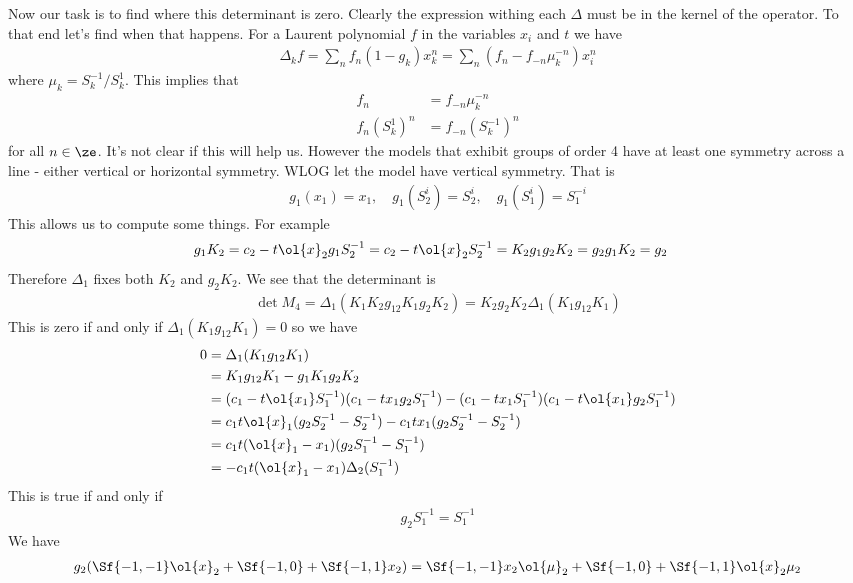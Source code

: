  Now our task is to find where this determinant is zero. Clearly the expression withing each $\Delta$ must be in the kernel of the operator. To that end let's find when that happens. For a Laurent polynomial $f$ in the variables $x_i$ and $t$ we have
\begin{align}
	\Delta_k f = \sum_n f_n (1-g_k)x_k^n = \sum_n (f_n - f_{-n}\mu_k^{-n})x_i^n
\end{align}
where $\mu_k = S_k^{-1}/S_k^1$. This implies that
\begin{align}
	f_{n} &= f_{-n} \mu_k^{-n}\\
	f_{n} (S_k^1)^n &= f_{-n}(S_k^{-1})^n
\end{align}
for all $n \in \ze$. It's not clear if this will help us. However the models that exhibit groups of order 4 have at least one symmetry across a line - either vertical or horizontal symmetry. WLOG let the model have vertical symmetry. That is 
\begin{align}
	g_1(x_1) = x_1, \quad g_1(S_2^i) = S_2^i,\quad g_1(S_1^i) = S_1^{-i}
\end{align}
This allows us to compute some things. For example
\begin{align}
	g_1 K_2 &= c_2 - t\ol{x}_2 g_1S_2^{-1} = c_2 - t\ol{x}_2 S_2^{-1} = K_2
	g_1g_2K_2 = g_2 g_1 K_2 = g_2
\end{align}
Therefore $\Delta_1$ fixes both $K_2$ and $g_2K_2$.
We see that the determinant is
\begin{align}
	\det M_4 = \Delta_1  (K_1K_2 g_{12}K_1 g_2K_2) = K_2 g_2K_2 \Delta_1  (K_1 g_{12}K_1)
\end{align}
This is zero if and only if $\Delta_1  (K_1 g_{12}K_1) = 0$ so we have
\begin{align}
	0&=\Delta_1  (K_1 g_{12}K_1) \\
	&= K_1g_{12}K_1 - g_1 K_1 g_2 K_2 \\
	&= (c_1-t\ol{x_1}S_1^{-1})(c_1-tx_1g_2S_1^{-1})-(c_1-tx_1S_1^{-1})(c_1-t\ol{x_1}g_2S_1^{-1})\\
	&= c_1 t \ol{x}_1 (g_2 S_2^{-1} - S_2^{-1}) - c_1 t x_1 (g_2 S_2^{-1} - S_2^{-1})\\
	&= c_1 t (\ol{x}_1-x_1)(g_2 S_1^{-1}-S_1^{-1})\\
	& = -c_1 t(\ol{x}_1-x_1)\Delta_2(S_1^{-1})
\end{align}
This is true if and only if
\begin{align}
	g_2 S_1^{-1} = S_1^{-1}
\end{align}
We have
\begin{align}
	g_2 (\Sf{-1,-1}\ol{x}_2+\Sf{-1,0}+\Sf{-1,1}x_2) = \Sf{-1,-1}x_2 \ol{\mu}_2+\Sf{-1,0}+\Sf{-1,1}\ol{x}_2\mu_2
\end{align}
